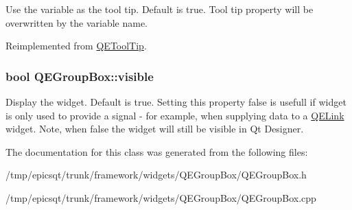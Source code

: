 \label{classQEGroupBox_a98b187722b014911112842e2bf315720}
Use the variable as the tool tip. Default is true. Tool tip property will be overwritten by the variable name. 

Reimplemented from \hyperlink{classQEToolTip}{QEToolTip}.

\hypertarget{classQEGroupBox_a05617d911ff363073f9b1f2c40e2db71}{
\subsubsection[{visible}]{\setlength{\rightskip}{0pt plus 5cm}bool QEGroupBox::visible}}
\label{classQEGroupBox_a05617d911ff363073f9b1f2c40e2db71}
Display the widget. Default is true. Setting this property false is usefull if widget is only used to provide a signal -\/ for example, when supplying data to a \hyperlink{classQELink}{QELink} widget. Note, when false the widget will still be visible in Qt Designer. 

The documentation for this class was generated from the following files:\begin{DoxyCompactItemize}
\item 
/tmp/epicsqt/trunk/framework/widgets/QEGroupBox/QEGroupBox.h\item 
/tmp/epicsqt/trunk/framework/widgets/QEGroupBox/QEGroupBox.cpp\end{DoxyCompactItemize}
